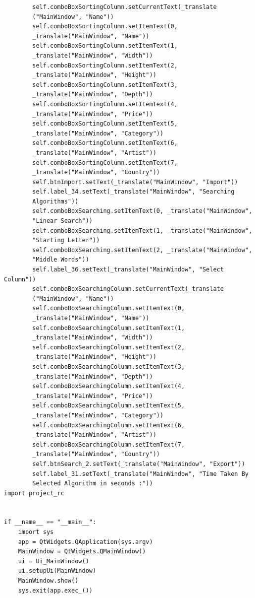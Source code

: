 \documentclass[12pt]{article}
\begin{document}
\begin{verbatim}
        self.comboBoxSortingColumn.setCurrentText(_translate
        ("MainWindow", "Name"))
        self.comboBoxSortingColumn.setItemText(0,
        _translate("MainWindow", "Name"))
        self.comboBoxSortingColumn.setItemText(1,
        _translate("MainWindow", "Width"))
        self.comboBoxSortingColumn.setItemText(2,
        _translate("MainWindow", "Height"))
        self.comboBoxSortingColumn.setItemText(3,
        _translate("MainWindow", "Depth"))
        self.comboBoxSortingColumn.setItemText(4,
        _translate("MainWindow", "Price"))
        self.comboBoxSortingColumn.setItemText(5,
        _translate("MainWindow", "Category"))
        self.comboBoxSortingColumn.setItemText(6,
        _translate("MainWindow", "Artist"))
        self.comboBoxSortingColumn.setItemText(7,
        _translate("MainWindow", "Country"))
        self.btnImport.setText(_translate("MainWindow", "Import"))
        self.label_34.setText(_translate("MainWindow", "Searching
        Algorithms"))
        self.comboBoxSearching.setItemText(0, _translate("MainWindow",
        "Linear Search"))
        self.comboBoxSearching.setItemText(1, _translate("MainWindow",
        "Starting Letter"))
        self.comboBoxSearching.setItemText(2, _translate("MainWindow",
        "Middle Words"))
        self.label_36.setText(_translate("MainWindow", "Select Column"))
        self.comboBoxSearchingColumn.setCurrentText(_translate
        ("MainWindow", "Name"))
        self.comboBoxSearchingColumn.setItemText(0,
        _translate("MainWindow", "Name"))
        self.comboBoxSearchingColumn.setItemText(1,
        _translate("MainWindow", "Width"))
        self.comboBoxSearchingColumn.setItemText(2,
        _translate("MainWindow", "Height"))
        self.comboBoxSearchingColumn.setItemText(3,
        _translate("MainWindow", "Depth"))
        self.comboBoxSearchingColumn.setItemText(4,
        _translate("MainWindow", "Price"))
        self.comboBoxSearchingColumn.setItemText(5,
        _translate("MainWindow", "Category"))
        self.comboBoxSearchingColumn.setItemText(6,
        _translate("MainWindow", "Artist"))
        self.comboBoxSearchingColumn.setItemText(7,
        _translate("MainWindow", "Country"))
        self.btnSearch_2.setText(_translate("MainWindow", "Export"))
        self.label_31.setText(_translate("MainWindow", "Time Taken By
        Selected Algorithm in seconds :")) 
import project_rc


if __name__ == "__main__":
    import sys
    app = QtWidgets.QApplication(sys.argv)
    MainWindow = QtWidgets.QMainWindow()
    ui = Ui_MainWindow()
    ui.setupUi(MainWindow)
    MainWindow.show()
    sys.exit(app.exec_())
    \end{verbatim}
    
\end{document}
